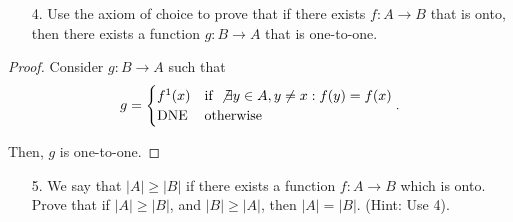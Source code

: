 \documentclass[10pt]{article}
\theoremstyle{definition}
\theoremstyle{plain}
\begin{document}
\pagebreak



\begin{enumerate}
\item[4.] Use the axiom of choice to prove that if there exists $f:A \to B$ that is onto, then there exists a function $g:B \to A$ that is one-to-one.
\end{enumerate}

\begin{proof}
Consider $g:B\to A$ such that
$$g=
\begin{cases}
f^{1}(x) &\text{if }\not\exists y\in A,y\neq x: f(y)=f(x) \\
\text{DNE} &\text{otherwise}
\end{cases}.$$

Then, $g$ is one-to-one.
\end{proof}

\begin{enumerate}
\item[5.] We say that $|A| \geq |B|$ if there exists a function $f:A \to B$ which is onto.  Prove that if $|A| \geq |B|$, and $|B| \geq |A|$, then $|A| = |B|$.  (Hint:  Use 4).
\end{enumerate}
\end{document}
